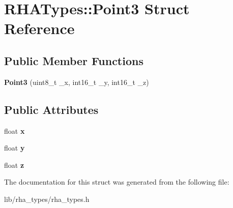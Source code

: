 \hypertarget{structRHATypes_1_1Point3}{}\section{R\+H\+A\+Types\+:\+:Point3 Struct Reference}
\label{structRHATypes_1_1Point3}
\subsection*{Public Member Functions}
\begin{DoxyCompactItemize}
\item 
{\bfseries Point3} (uint8\+\_\+t \+\_\+x, int16\+\_\+t \+\_\+y, int16\+\_\+t \+\_\+z)\hypertarget{structRHATypes_1_1Point3_a37bfea24505eeeae13159c608ec24b96}{}\label{structRHATypes_1_1Point3_a37bfea24505eeeae13159c608ec24b96}

\end{DoxyCompactItemize}
\subsection*{Public Attributes}
\begin{DoxyCompactItemize}
\item 
float {\bfseries x}\hypertarget{structRHATypes_1_1Point3_ae336769d59b7822a5adb0aa5b397eff9}{}\label{structRHATypes_1_1Point3_ae336769d59b7822a5adb0aa5b397eff9}

\item 
float {\bfseries y}\hypertarget{structRHATypes_1_1Point3_af2cda4562b2b132a583a39e4a4aaa4d4}{}\label{structRHATypes_1_1Point3_af2cda4562b2b132a583a39e4a4aaa4d4}

\item 
float {\bfseries z}\hypertarget{structRHATypes_1_1Point3_ac53c0dad34ee6f5ade6b12ad0afc7cd0}{}\label{structRHATypes_1_1Point3_ac53c0dad34ee6f5ade6b12ad0afc7cd0}

\end{DoxyCompactItemize}


The documentation for this struct was generated from the following file\+:\begin{DoxyCompactItemize}
\item 
lib/rha\+\_\+types/rha\+\_\+types.\+h\end{DoxyCompactItemize}
